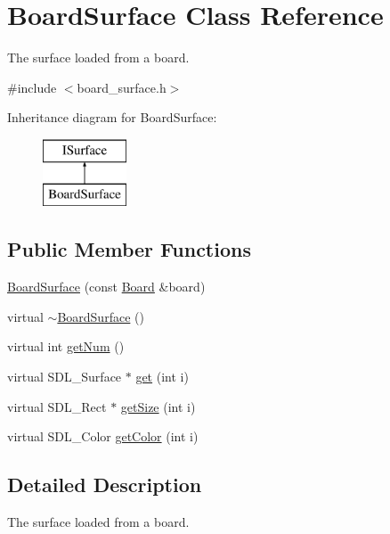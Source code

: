 \hypertarget{class_board_surface}{}\section{Board\+Surface Class Reference}
\label{class_board_surface}


The surface loaded from a board.  




{\ttfamily \#include $<$board\+\_\+surface.\+h$>$}

Inheritance diagram for Board\+Surface\+:\begin{figure}[H]
\begin{center}
\leavevmode
\includegraphics[height=2.000000cm]{class_board_surface}
\end{center}
\end{figure}
\subsection*{Public Member Functions}
\begin{DoxyCompactItemize}
\item 
\mbox{\hyperlink{class_board_surface_a981d6c6f85322bfb3998512b9a83c5dc}{Board\+Surface}} (const \mbox{\hyperlink{class_board}{Board}} \&board)
\item 
virtual \mbox{\hyperlink{class_board_surface_a23ded7b4d613c8be63530d2576809eca}{$\sim$\+Board\+Surface}} ()
\item 
virtual int \mbox{\hyperlink{class_board_surface_ae4a6c65ef771b0a4c46fab6297ce0928}{get\+Num}} ()
\item 
virtual S\+D\+L\+\_\+\+Surface $\ast$ \mbox{\hyperlink{class_board_surface_a1f70650bc36f591b9a2f44576da4c77c}{get}} (int i)
\item 
virtual S\+D\+L\+\_\+\+Rect $\ast$ \mbox{\hyperlink{class_board_surface_a920508ee01c7ad51b33f4411b0acfba1}{get\+Size}} (int i)
\item 
virtual S\+D\+L\+\_\+\+Color \mbox{\hyperlink{class_board_surface_aaede8bb86e00ae26f235dd9437ecded7}{get\+Color}} (int i)
\end{DoxyCompactItemize}


\subsection{Detailed Description}
The surface loaded from a board. 

